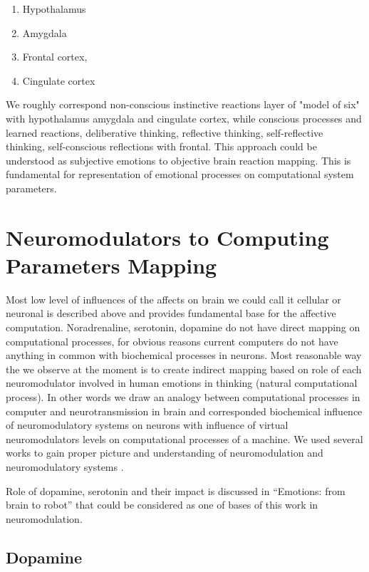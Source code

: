 \begin{enumerate}
 \item Hypothalamus
 \item Amygdala
 \item Frontal cortex, 
 \item Cingulate cortex
\end{enumerate}

We roughly correspond non-conscious instinctive reactions layer of "model of six" \cite{emotionmachine} with hypothalamus amygdala and cingulate cortex, while conscious processes and learned reactions, deliberative thinking, reflective thinking, self-reflective thinking, self-conscious reflections with frontal. This approach could be understood as subjective emotions to objective brain reaction mapping. This is fundamental for representation of emotional processes on computational system parameters.

\section{Neuromodulators to Computing Parameters Mapping}

Most low level of influences of the affects on brain we could call it cellular or neuronal is described above and provides fundamental base for the affective computation. Noradrenaline, serotonin, dopamine do not have direct mapping on computational processes, for obvious reasons current computers do not have anything in common with biochemical processes in neurons. Most reasonable way the we observe at the moment is to create indirect mapping based on role of each neuromodulator involved in human emotions in thinking (natural computational process). In other words we draw an analogy between computational processes in computer and neurotransmission in brain and corresponded biochemical influence of neuromodulatory systems on neurons with influence of virtual neuromodulators levels on computational processes of a machine. We used several works to gain proper picture and understanding of neuromodulation and neuromodulatory systems \cite{cubeofemotions, emotionsbraintorobot, neuromodulatory, on_role_of_emotion}. 

Role of dopamine, serotonin  and their impact is discussed in ``Emotions: from brain to robot'' \cite{emotionsbraintorobot} that could be considered as one of bases of this work in neuromodulation.

\subsection{Dopamine}

